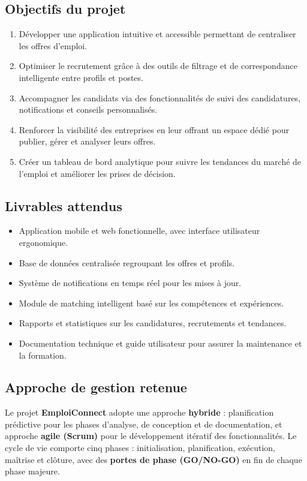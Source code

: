 \documentclass[11pt,a4paper]{article}
\begin{document}
\subsection{Objectifs du projet}

\begin{enumerate}
    \item Développer une application intuitive et accessible permettant de centraliser les offres d'emploi.
    \item Optimiser le recrutement grâce à des outils de filtrage et de correspondance intelligente entre profils et postes.
    \item Accompagner les candidats via des fonctionnalités de suivi des candidatures, notifications et conseils personnalisés.
    \item Renforcer la visibilité des entreprises en leur offrant un espace dédié pour publier, gérer et analyser leurs offres.
    \item Créer un tableau de bord analytique pour suivre les tendances du marché de l'emploi et améliorer les prises de décision.
\end{enumerate}

\subsection{Livrables attendus}

\begin{itemize}
    \item Application mobile et web fonctionnelle, avec interface utilisateur ergonomique.
    \item Base de données centralisée regroupant les offres et profils.
    \item Système de notifications en temps réel pour les mises à jour.
    \item Module de matching intelligent basé sur les compétences et expériences.
    \item Rapports et statistiques sur les candidatures, recrutements et tendances.
    \item Documentation technique et guide utilisateur pour assurer la maintenance et la formation.
\end{itemize}

\subsection{Approche de gestion retenue}

Le projet \textbf{EmploiConnect} adopte une approche \textbf{hybride} : planification prédictive pour les phases d'analyse, de conception et de documentation, et approche \textbf{agile (Scrum)} pour le développement itératif des fonctionnalités. Le cycle de vie comporte cinq phases : initialisation, planification, exécution, maîtrise et clôture, avec des \textbf{portes de phase (GO/NO-GO)} en fin de chaque phase majeure.
\end{document}
